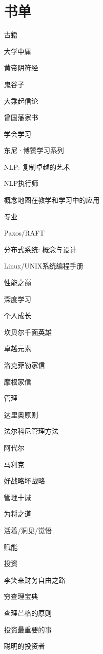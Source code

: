 \section{书单}

古籍
\begin{enumbox} 
\item 大学中庸
\item 黄帝阴符经
\item 鬼谷子
\item 大乘起信论
\item 曾国藩家书
\end{enumbox} 

学会学习
\begin{enumbox}
\item 东尼·博赞学习系列
\item NLP: 复制卓越的艺术
\item NLP执行师
\item 概念地图在教学和学习中的应用
\end{enumbox}

专业
\begin{enumbox}
\item Paxos/RAFT
\item 分布式系统: 概念与设计
\item Linux/UNIX系统编程手册
\item 性能之巅
\item 深度学习
\end{enumbox}

个人成长
\begin{enumbox}
\item 坎贝尔千面英雄
\item 卓越元素
\item 洛克菲勒家信
\item 摩根家信
\end{enumbox} 

管理
\begin{enumbox} 
\item 达里奥原则
\item 法尔科尼管理方法
\item 阿代尔
\item 马利克
\item 好战略坏战略
\item 管理十诫
\item 为将之道
\item 活着/洞见/觉悟
\item 赋能
\end{enumbox} 

投资
\begin{enumbox} 
\item 李笑来财务自由之路
\item 穷查理宝典
\item 查理芒格的原则
\item 投资最重要的事
\item 聪明的投资者
\end{enumbox} 

